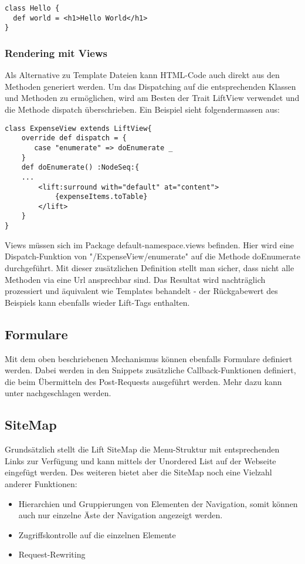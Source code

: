 \begin{lstlisting}[caption=Snippet]
class Hello {
  def world = <h1>Hello World</h1>
}
\end{lstlisting}


\subsubsection{Rendering mit Views}
Als Alternative zu Template Dateien kann HTML-Code auch direkt aus den Methoden generiert werden. Um das Dispatching auf die entsprechenden Klassen und Methoden zu erm\"oglichen, wird am Besten der Trait LiftView verwendet und die Methode dispatch \"uberschrieben. Ein Beispiel sieht folgendermassen aus:

\begin{lstlisting}[caption=Views]
class ExpenseView extends LiftView{
    override def dispatch = { 
       case "enumerate" => doEnumerate _
    }
    def doEnumerate() :NodeSeq:{
 	...
        <lift:surround with="default" at="content">
            {expenseItems.toTable}
        </lift>
    }	
}
\end{lstlisting}
 
Views m\"ussen sich im Package {default-namespace}.views befinden. Hier wird eine Dispatch-Funktion von "/ExpenseView/enumerate" auf die Methode doEnumerate durchgef\"uhrt. Mit dieser zus\"atzlichen Definition stellt man sicher, dass nicht alle Methoden via eine Url ansprechbar sind. Das Resultat wird nachtr\"aglich prozessiert und \"aquivalent wie Templates behandelt - der R\"uckgabewert des Beispiels kann ebenfalls wieder Lift-Tags enthalten.

\subsection{Formulare}
Mit dem oben beschriebenen Mechanismus k\"onnen ebenfalls Formulare definiert werden. Dabei werden in den Snippets zus\"atzliche Callback-Funktionen definiert, die beim \"Ubermitteln des Post-Requests ausgef\"uhrt werden. Mehr dazu kann unter  \cite[p. 47-58]{chen2009lift} nachgeschlagen werden.

\subsection{SiteMap \cite[p. 61-70]{chen2009lift}}
Grunds\"atzlich stellt die Lift SiteMap die Menu-Struktur mit entsprechenden Links zur Verf\"ugung und kann mittels der Unordered List auf der Webseite eingef\"ugt werden. Des weiteren bietet aber die SiteMap noch eine Vielzahl anderer Funktionen:
\begin{itemize}
\item Hierarchien und Gruppierungen von Elementen der Navigation, somit k\"onnen auch nur einzelne \"Aste der Navigation angezeigt werden.
\item Zugriffskontrolle auf die einzelnen Elemente
\item Request-Rewriting
\end{itemize}

